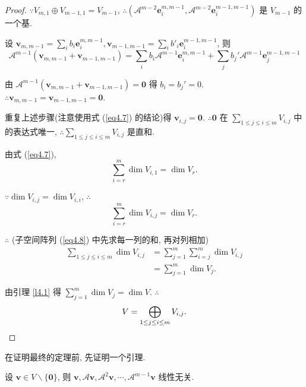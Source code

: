 \documentclass[color=black,device=normal,lang=cn,mode=geye]{elegantnote}
\begin{document}
\begin{proof}
    $\because V_{m,1}\oplus V_{m-1,1}=V_{m-1}$, $\therefore(\mathcal{A}^{m-2}\boldsymbol{e}_i^{m,m-1},\mathcal{A}^{m-2}\boldsymbol{e}_i^{m-1,m-1})$ 是 $V_{m-1}$ 的一个基.

    设 $\boldsymbol{v}_{m,m-1}=\sum\limits_ib_i\boldsymbol{e}_i^{m,m-1},\boldsymbol{v}_{m-1,m-1}=\sum\limits_ib'_i\boldsymbol{e}_i^{m-1,m-1}$, 则
    \[\mathcal{A}^{m-1}(\boldsymbol{v}_{m,m-1}+\boldsymbol{v}_{m-1,m-1})=\sum\limits_ib_i\mathcal{A}^{m-1}\boldsymbol{e}_i^{m,m-1}+\sum\limits_jb_j'\mathcal{A}^{m-1}\boldsymbol{e}_j^{m-1,m-1}\]
    
    由 $\mathcal{A}^{m-1}(\boldsymbol{v}_{m,m-1}+\boldsymbol{v}_{m-1,m-1})=\boldsymbol{0}$ 得 $b_i=b_j'=0$. $\therefore\boldsymbol{v}_{m,m-1}=\boldsymbol{v}_{m-1,m-1}=\boldsymbol{0}$.

    重复上述步骤(注意使用式 (\ref{eq4.7}) 的结论)得 $\boldsymbol{v}_{i,j}=\boldsymbol{0}$. $\therefore\boldsymbol{0}$ 在 $\sum\limits_{1\leq j\leq i\leq m}V_{i,j}$ 中的表达式唯一, $\therefore\sum\limits_{1\leq j\leq i\leq m}V_{i,j}$ 是直和.

    由式 (\ref{eq4.7}),
    \[\sum\limits_{i=r}^m\dim V_{i,1}=\dim V_r.\]

    $\because\dim V_{i,j}=\dim V_{i,i}$, $\therefore$
    \[\sum\limits_{i=r}^m\dim V_{i,j}=\dim V_r.\]

    $\therefore$ (子空间阵列 (\ref{eq4.8}) 中先求每一列的和, 再对列相加)
    \begin{align*}
        \sum\limits_{1\leq j\leq i\leq m}\dim V_{i,j} & =\sum\limits_{j=1}^m\sum\limits_{i=j}^m\dim V_{i,j} \\
        & =\sum\limits_{j=1}^m\dim V_j.
    \end{align*}

    由引理 \ref{l4.1} 得 $\sum\limits_{j=1}^m\dim V_j=\dim V$. $\therefore$
    \[V=\bigoplus\limits_{1\leq j\leq i\leq m}V_{i,j}.\qedhere\]
\end{proof}
在证明最终的定理前, 先证明一个引理.
\begin{lemma}\label{l4.2}
    设 $\boldsymbol{v}\in V\backslash\{\boldsymbol{0}\}$, 则 $\boldsymbol{v},\mathcal{A}\boldsymbol{v},\mathcal{A}^2\boldsymbol{v},\cdots,\mathcal{A}^{m-1}\boldsymbol{v}$ 线性无关.
\end{lemma}
\end{document}
